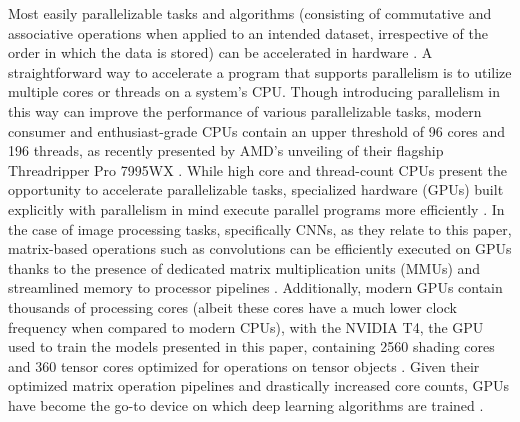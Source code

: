 Most easily parallelizable tasks and algorithms (consisting of commutative and associative operations when applied to an intended dataset, irrespective of the order in which the data is stored) can be accelerated in hardware \cite{gao_parallel_2012}. A straightforward way to accelerate a program that supports parallelism is to utilize multiple cores or threads on a system's CPU. Though introducing parallelism in this way can improve the performance of various parallelizable tasks, modern consumer and enthusiast-grade CPUs contain an upper threshold of 96 cores and 196 threads, as recently presented by AMD's unveiling of their flagship Threadripper Pro 7995WX \cite{noauthor_amd_nodate}. While high core and thread-count CPUs present the opportunity to accelerate parallelizable tasks, specialized hardware (GPUs) built explicitly with parallelism in mind execute parallel programs more efficiently \cite{gao_parallel_2012}. In the case of image processing tasks, specifically CNNs, as they relate to this paper, matrix-based operations such as convolutions can be efficiently executed on GPUs thanks to the presence of dedicated matrix multiplication units (MMUs) and streamlined memory to processor pipelines \cite{fatahalian_understanding_2004}. Additionally, modern GPUs contain thousands of processing cores (albeit these cores have a much lower clock frequency when compared to modern CPUs), with the NVIDIA T4, the GPU used to train the models presented in this paper, containing 2560 shading cores and 360 tensor cores optimized for operations on tensor objects \cite{emily_apsey_tesla_2019}. Given their optimized matrix operation pipelines and drastically increased core counts, GPUs have become the go-to device on which deep learning algorithms are trained \cite{steinkraus_using_2005}.
